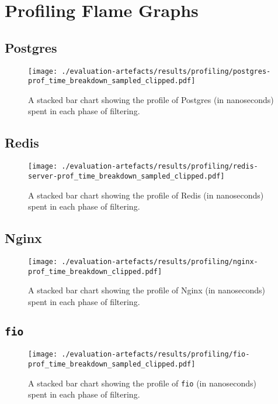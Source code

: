 \section{Profiling Flame Graphs}

\subsection{Postgres}
\begin{figure}[H]
    \centering
    \texttt{[image: ./evaluation-artefacts/results/profiling/postgres-prof\_time\_breakdown\_sampled\_clipped.pdf]}
    \caption{A stacked bar chart showing the profile of Postgres (in nanoseconds) \af
    spent in each phase of filtering.}
    \label{fig:postgres-profile}
\end{figure}


\subsection{Redis}
\begin{figure}[H]
    \centering
    \texttt{[image: ./evaluation-artefacts/results/profiling/redis-server-prof\_time\_breakdown\_sampled\_clipped.pdf]}
    \caption{A stacked bar chart showing the profile of Redis (in nanoseconds) \af
    spent in each phase of filtering.}
    \label{fig:redis-profile}
\end{figure}


\subsection{Nginx}
\begin{figure}[H]
    \centering
    \texttt{[image: ./evaluation-artefacts/results/profiling/nginx-prof\_time\_breakdown\_clipped.pdf]}
    \caption{A stacked bar chart showing the profile of Nginx (in nanoseconds) \af
    spent in each phase of filtering.}
    \label{fig:nginx-profile}
\end{figure}

\subsection{\texttt{fio}}
\begin{figure}[H]
    \centering
    \texttt{[image: ./evaluation-artefacts/results/profiling/fio-prof\_time\_breakdown\_sampled\_clipped.pdf]}
    \caption{A stacked bar chart showing the profile of \texttt{fio} (in nanoseconds) \af
    spent in each phase of filtering.}
    \label{fig:fio-profile}
\end{figure}

